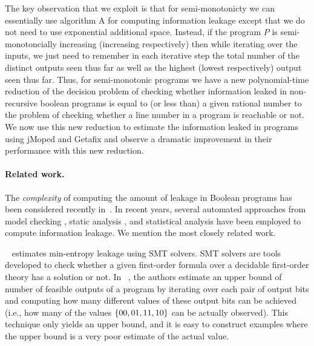 The key observation that we exploit is that for semi-monotonicty we can essentially use algorithm A for computing information leakage except that we do not need to use exponential additional space. Instead, if the program $P$ is semi-monotoncially increasing (increasing respectively) then while iterating over the inputs,  we just need to remember in each iterative step  the total number of the distinct outputs seen thus far as well as the highest  (lowest respectively) output seen thus far. Thus, for semi-monotonic programs we have a new polynomial-time reduction of the decision problem of checking whether information leaked  in non-recursive boolean programs is  equal to (or less than) a given rational number to the problem of checking whether a line number in a program is reachable or not.  We now use this new reduction to estimate the information leaked in programs using jMoped and Getafix and  observe a dramatic improvement in their performance with this new reduction.



  
 
%
\paragraph{Related work.}
\label{sec:related}
The \emph{complexity} of computing the amount of leakage in Boolean programs has been   considered recently in~\cite{Jp1,Jp2,Jp3,Krish,rch:mu:fsttcs2012,Krish,POST}. 
In recent years, several automated approaches from model checking \cite{BackesKopf,Kopf,Kostas07,Kostas08}, static analysis \cite{clark94,clark05,clark07,BackesKopf}, and statistical analysis \cite{Kopf,Chothia}  have been employed to compute information leakage. We mention the most closely related work.


~\cite{Plas11, Plas13} estimates min-entropy leakage using SMT solvers. SMT solvers are tools developed to check whether a given first-order formula over a decidable first-order theory has a solution or not.  In ~\cite{Plas11, Plas13}, the authors estimate an upper bound of number of feasible outputs of a program by iterating over each pair of output bits and computing how many different values of these output bits can be achieved (i.e., how many of the values $\{ 00,01,11,10 \}$ can be actually observed).  This technique only yields an upper bound, and it is easy to construct examples where the upper bound is a very poor estimate of the actual value.
 


